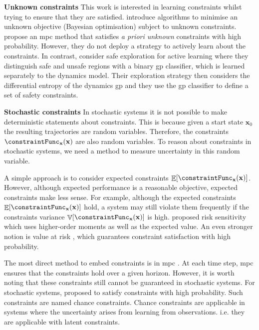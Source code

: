 \documentclass{mimosis-class/mimosis}
\numberwithin{equation}{chapter}
\DeclareMathOperator{\E}{\mathbb{E}}
\DeclareMathOperator{\V}{\mathbb{V}}
\newcommand{\state}{\ensuremath{\mathbf{x}}}
\begin{document}
\textbf{Unknown constraints}
This work is interested in learning constraints whilst trying to ensure that they are satisfied.
\cite{ariafarADMMBO2019,gelbartBayesian2014} introduce algorithms to minimise an unknown objective
(Bayesian optimisation) subject to unknown constraints.
\cite{sadighSafe2016} propose an \acrshort{mpc} method that satisfies \emph{a priori unknown} constraints with high probability.
However, they do not deploy a strategy to actively learn about the constraints.
In contrast, \cite{schreiterSafe2015} consider safe exploration for active learning
where they distinguish safe and unsafe regions with a binary \acrshort{gp} classifier, which is
learned separately to the dynamics model. Their exploration strategy then considers
the differential entropy of the dynamics \acrshort{gp} and they use the \acrshort{gp} classifier to define
a set of safety constraints.

\textbf{Stochastic constraints}
In stochastic systems it is not possible to make deterministic statements about constraints.
This is because given a start state \(\state_0\) the resulting trajectories are random variables.
Therefore, the constraints \(\constraintFunc_{\state}(\state)\) are also random variables.
To reason about constraints in stochastic systems, we need a method to measure uncertainty in this
random variable.

A simple approach is to consider expected constraints \(\E[\constraintFunc_{\state}(\state)]\).
However, although expected performance is a reasonable objective, expected constraints make less sense.
For example, although the expected constraints \(\E[\constraintFunc_{\state}(\state)]\) hold, a system may
still violate them frequently if the constraints variance \(\V[\constraintFunc_{\state}(\state)]\) is high.
\cite{ferberGames1958} proposed risk sensitivity which uses higher-order moments as well as the expected value.
An even stronger notion is value at risk \citep{duffieOverview1997a}, which guarantees constraint satisfaction
with high probability.

The most direct method to embed constraints is in \acrshort{mpc} \citep{eduardof.Model2007}.
At each time step, \acrshort{mpc} ensures that the constraints hold over a given horizon.
However, it is worth noting that these constraints still cannot be guaranteed in stochastic systems.
For stochastic systems, \cite{schwarmChanceconstrained1999} proposed to satisfy constraints with high probability.
Such constraints are named chance constraints.
Chance constraints are applicable in systems where the uncertainty arises from learning from observations.
i.e. they are applicable with latent constraints.
\end{document}
